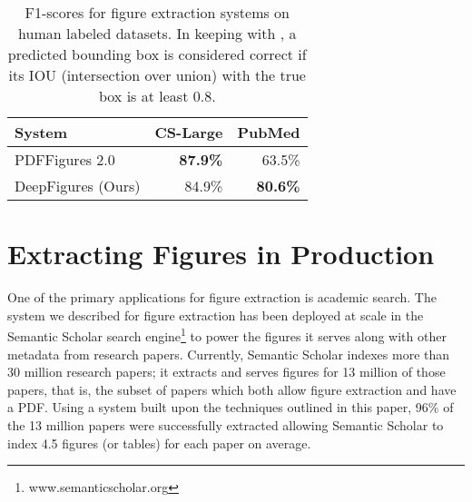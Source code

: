 \documentclass[sigconf]{acmart}
\begin{document}
\begin{table}
\begin{center}
\begin{tabular}{|l||r|r|} \hline
 System & CS-Large & PubMed\\ \hline 
 PDFFigures 2.0 \cite{pdffigures2} & \bf{87.9\%} & 63.5\%  \\ %
 DeepFigures (Ours) & 84.9\% & \bf{80.6\%} \\ \hline
\end{tabular}
\vspace{0.2cm}
\caption{F1-scores for figure extraction systems on human labeled datasets. In keeping with \cite{pdffigures2}, a predicted bounding box is considered correct if its IOU (intersection over union) with the true box is at least 0.8.}\label{table:eval}
\end{center}
\label{tab:figclsRes}
\end{table}%
\section{Extracting Figures in Production}\label{deployment}%

One of the primary applications for figure extraction is academic search. The system we described for figure extraction has been deployed at scale in the Semantic Scholar search engine\footnote{www.semanticscholar.org} to power the figures it serves along with other metadata from research papers. Currently, Semantic Scholar indexes more than 30 million research papers; it extracts and serves figures for 13 million of those papers, that is, the subset of papers which both allow figure extraction and have a PDF. Using a system built upon the techniques outlined in this paper, 96\% of the 13 million papers were successfully extracted allowing Semantic Scholar to index 4.5 figures (or tables) for each paper on average.
\end{document}
